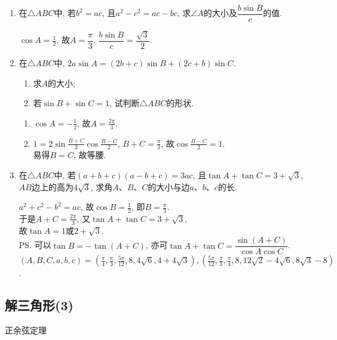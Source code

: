 \begin{enumerate}
\item 在$\triangle{ABC}$中, 若$b^2=ac$, 且$a^2-c^2=ac-bc$, 求$\angle{A}$的大小及$\dfrac{b\sin{B}}{c}$的值. 
\begin{jieda}
$\cos{A}=\frac{1}{2}$, 故$A=\dfrac{\pi}{3}$, $\dfrac{b\sin{B}}{c}=\dfrac{\sqrt{3}}{2}$. 
\end{jieda}

\item 在$\triangle{ABC}$中, $2a\sin{A}=(2b+c)\sin{B}+(2c+b)\sin{C}$. 
\begin{enumerate}
\item 求$A$的大小; 
\item 若$\sin{B}+\sin{C}=1$, 试判断$\triangle{ABC}$的形状. 
\end{enumerate}
\begin{jieda}
\begin{enumerate}
\item $\cos{A}=-\frac{1}{2}$, 故$A=\frac{2\pi}{3}$. 
\item $1=2\sin\frac{B+C}{2}\cos\frac{B-C}{2}$, $B+C=\frac{\pi}{3}$, 故$\cos\frac{B-C}{2}=1$. \\
易得$B=C$, 故等腰. 
\end{enumerate}
\end{jieda}

\item 在$\triangle{ABC}$中, 若$(a+b+c)(a-b+c)=3ac$, 且$\tan{A}+\tan{C}=3+\sqrt{3}$, $AB$边上的高为$4\sqrt{3}$, 求角$A$、$B$、$C$的大小与边$a$、$b$、$c$的长.
\begin{jieda}
$a^2+c^2-b^2=ac$, 故$\cos{B}=\frac{1}{2}$, 即$B=\frac{\pi}{3}$. \\
于是$A+C=\frac{2\pi}{3}$, 又$\tan{A}+\tan{C}=3+\sqrt{3}$, \\
故$\tan{A}=1$或$2+\sqrt{3}$. \\
\ps 可以$\tan{B}=-\tan(A+C)$, 亦可$\tan{A}+\tan{C}=\dfrac{\sin(A+C)}{\cos{A}\cos{C}}$. \\
$(A,B,C,a,b,c)=(\frac{\pi}{4},\frac{\pi}{3},\frac{5\pi}{12},8,4\sqrt{6},4+4\sqrt{3}), (\frac{5\pi}{12},\frac{\pi}{3},\frac{\pi}{4},8,12\sqrt{2}-4\sqrt{6},8\sqrt{3}-8)$. 
\end{jieda}

\end{enumerate}



\subsection{解三角形(3)}
\zsd 正余弦定理

